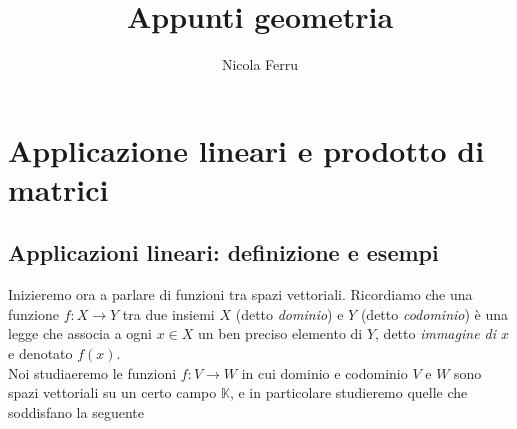 \documentclass{book}
\title{Appunti geometria}
\author{Nicola Ferru}
\begin{document}
\maketitle
\tableofcontents
\listoftables
\listoffigures





\chapter{Applicazione lineari e prodotto di matrici}
\section{Applicazioni lineari: definizione e esempi\label{applin}}
Inizieremo ora a parlare di funzioni tra spazi vettoriali. Ricordiamo che una funzione $f:X\to Y$ tra due insiemi
$X$ (detto \textit{dominio}) e $Y$ (detto \textit{codominio}) è una legge che associa a ogni $x\in X$ un ben
preciso elemento di $Y$, detto \textit{immagine di $x$} e denotato $f(x)$.\\
Noi studiaeremo le funzioni $f:V\to W$ in cui dominio e codominio $V$ e $W$ sono spazi vettoriali su un certo
campo $\mathds{K}$, e in particolare studieremo quelle che soddisfano la seguente
\end{document}
